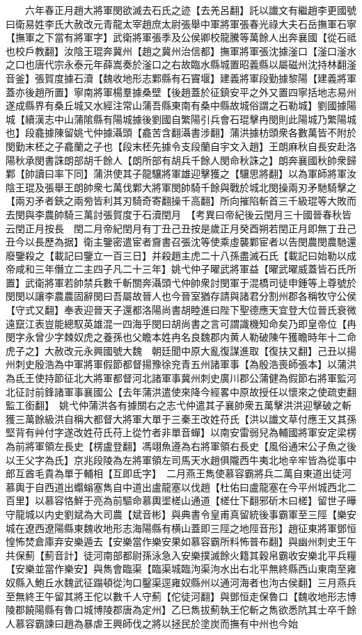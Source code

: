 　　六年春正月趙大將軍閔欲滅去石氏之迹【去羌呂翻】託以䜟文有繼趙李更國號曰衛易姓李氏大赦改元青龍太宰趙庶太尉張舉中軍將軍張春光祿大夫石岳撫軍石寧【撫軍之下當有將軍字】武衛將軍張季及公侯卿校龍騰等萬餘人出奔襄國【從石祗也校戶教翻】汝陰王琨奔冀州【趙之冀州治信都】撫軍將軍張沈據滏口【滏口滏水之口也唐代宗永泰元年薛嵩奏於滏口之右故臨水縣城置昭義縣以屬磁州沈持林翻滏音釜】張賀度據石瀆【魏收地形志鄴縣有石竇堰】建義將軍段勤據黎陽【建義將軍蓋亦後趙所置】寧南將軍楊羣據桑壁【後趙蓋於征鎮安平之外又置四寧括地志易州遂成縣界有桑丘城又水經注常山蒲吾縣東南有桑中縣故城俗謂之石勒城】劉國據陽城【續漢志中山蒲隂縣有陽城據後劉國自繁陽引兵會石琨擊冉閔則此陽城乃繁陽城也】段龕據陳留姚弋仲據灄頭【龕苦含翻灄書涉翻】蒲洪據枋頭衆各數萬皆不附於閔勤末柸之子龕蘭之子也【段末柸先據令支段蘭自宇文入趙】王朗麻秋自長安赴洛陽秋承閔書誅朗部胡千餘人【朗所部有胡兵千餘人閔命秋誅之】朗奔襄國秋帥衆歸鄴【帥讀曰率下同】蒲洪使其子龍驤將軍雄迎擊獲之【驤思將翻】以為軍師將軍汝陰王琨及張舉王朗帥衆七萬伐鄴大將軍閔帥騎千餘與戰於城北閔操兩刃矛馳騎擊之【兩刃矛者鋏之兩㫄皆利其刃騎奇寄翻操千高翻】所向摧陷斬首三千級琨等大敗而去閔與李農帥騎三萬討張賀度于石瀆閏月　【考異曰帝紀後云閏月三十國晉春秋皆云閏正月按長　閏二月帝紀閏月有丁丑己丑按是歲正月癸酉朔若閏正月即無丁丑己丑今以長歷為据】衛主鑒密遣宦者齎書召張沈等使乘虛襲鄴宦者以告閔農閔農馳還廢鑒殺之【載記曰鑒立一百三日】并殺趙主虎二十八孫盡滅石氏【載記曰始勒以成帝咸和三年僭立二主四子凡二十三年】姚弋仲子曜武將軍益【曜武曜威蓋皆石氏所置】武衛將軍若帥禁兵數千斬關奔灄頭弋仲帥衆討閔軍于混橋司徒申鍾等上尊號於閔閔以讓李農農固辭閔曰吾屬故晉人也今晉室猶存請與諸君分割州郡各稱牧守公侯【守式又翻】奉表迎晉天子還都洛陽尚書胡睦進曰陛下聖德應天宜登大位晉氏衰微遠竄江表豈能總馭英雄混一四海乎閔曰胡尚書之言可謂識機知命矣乃即皇帝位【冉閔字永曾少字棘奴虎之養孫也父瞻本姓冉名良魏郡内黄人勒破陳午獲瞻時年十二命虎子之】大赦改元永興國號大魏　朝廷聞中原大亂復謀進取【復扶又翻】己丑以揚州刺史殷浩為中軍將軍假節都督揚豫徐兖青五州諸軍事【為殷浩喪師張本】以蒲洪為氐王使持節征北大將軍都督河北諸軍事冀州刺史廣川郡公蒲健為假節右將軍監河北征討前鋒諸軍事襄國公【去年蒲洪遣使來降今經畧中原故授任以懷來之使疏吏翻監工銜翻】　姚弋仲蒲洪各有據關右之志弋仲遣其子襄帥衆五萬擊洪洪迎擊破之斬獲三萬餘級洪自稱大都督大將軍大單于三秦王改姓苻氏【洪以䜟文草付應王又其孫堅背有艸付字遂改姓苻氏苻上從竹者非單音蟬】以南安雷弱兒為輔國將軍安定梁楞為前將軍領左長史【楞盧登翻】馮翊魚遵為右將軍領右長史【風俗通宋公子魚之後以王父字為氏】京兆段陵為左將軍領左司馬天水趙俱隴西牛夷北地辛牢皆為從事中郎互酋毛貴為單于輔相【互即氐字】　二月燕王雋使慕容霸將兵二萬自東道出徒河慕輿于自西道出蠮螉塞雋自中道出盧龍塞以伐趙【杜佑曰盧龍塞在今平州城西北二百里】以慕容恪鮮于亮為前驅命慕輿埿槎山通道【槎仕下翻邪斫木曰槎】留世子曄守龍城以内史劉斌為大司農【斌音彬】與典書令皇甫真留統後事霸軍至三陘【樂安城在遼西遼陽縣東魏收地形志海陽縣有横山蓋即三陘之地陘音形】趙征東將軍鄧恒惶怖焚倉庫弃安樂遁去【安樂當作樂安果如慕容霸所料怖普布翻】與幽州刺史王午共保薊【薊音計】徒河南部都尉孫泳急入安樂撲滅餘火籍其穀帛霸收安樂北平兵糧【安樂並當作樂安】與雋會臨渠【臨渠城臨泃渠泃水出右北平無終縣西山東南至雍奴縣入鮑丘水魏武征蹋頓從泃口鑿渠逕雍奴縣州以通河海者也泃古侯翻】三月燕兵至無終王午留其將王佗以數千人守薊【佗徒河翻】與鄧恒走保魯口【魏收地形志博陵郡饒陽縣有魯口城博陵郡唐為定州】乙巳雋拔薊執王佗斬之雋欲悉阬其士卒千餘人慕容霸諫曰趙為暴虐王興師伐之將以拯民於塗炭而撫有中州也今始